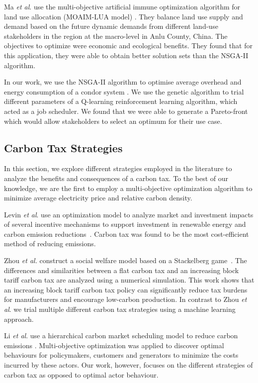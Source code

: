 Ma \textit{et al}. use the multi-objective artificial immune optimization algorithm for land use allocation (MOAIM-LUA model) \cite{Ma2015}. They balance land use supply and demand based on the future dynamic demands from different land-use stakeholders in the region at the macro-level in Anlu County, China. The objectives to optimize were economic and ecological benefits. They found that for this application, they were able to obtain better solution sets than the NSGA-II algorithm.

In our work, we use the NSGA-II algorithm to optimise average overhead and energy consumption of a condor system \cite{Kell2019}. We use the genetic algorithm to trial different parameters of a Q-learning reinforcement learning algorithm, which acted as a job scheduler. We found that we were able to generate a Pareto-front  which would allow stakeholders to select an optimum for their use case. 


\subsection{Carbon Tax Strategies}

In this section, we explore different strategies employed in the literature to analyze the benefits and consequences of a carbon tax. To the best of our knowledge, we are the first to employ a multi-objective optimization algorithm to minimize average electricity price and relative carbon density.

Levin \textit{et al}. use an optimization model to analyze market and investment impacts of several incentive mechanisms to support investment in renewable energy and carbon emission reductions~\cite{Levin2019}. Carbon tax was found to be the most cost-efficient method of reducing emissions.

Zhou \textit{et al.} construct a social welfare model based on a Stackelberg game~\cite{Zhou2019}. The differences and similarities between a flat carbon tax and an increasing block tariff carbon tax are analyzed using a numerical simulation. This work shows that an increasing block tariff carbon tax policy can significantly reduce tax burdens for manufacturers and encourage low-carbon production. In contrast to Zhou \textit{et al}. we trial multiple different carbon tax strategies using a machine learning approach. 

Li \textit{et al}. use a hierarchical carbon market scheduling model to reduce carbon emissions \cite{Li2017}. Multi-objective optimization was applied to discover optimal behaviours for policymakers, customers and generators to minimize the costs incurred by these actors. Our work, however, focuses on the different strategies of carbon tax as opposed to optimal actor behaviour.


